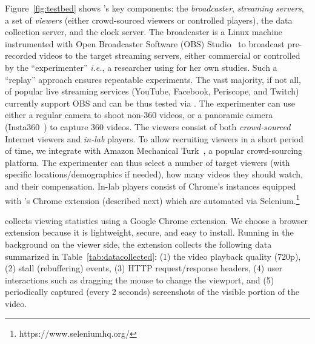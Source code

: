 Figure~\ref{fig:testbed} shows \lime's key components: the \emph{broadcaster}, \emph{streaming servers}, a set of \emph{viewers} (either crowd-sourced viewers or controlled players), the data collection server, and the clock server.
%
The broadcaster is a Linux machine instrumented with Open Broadcaster Software (OBS) Studio~\cite{obs} to broadcast pre-recorded videos to the target streaming servers, either commercial or controlled by the ``experimenter'' \emph{i.e.}, a researcher using \lime for her own studies. Such a ``replay'' approach ensures repeatable experiments.
%
The vast majority, if not all, of popular live streaming services (\eg YouTube, Facebook, Periscope, and Twitch) currently support OBS and can be thus tested via \lime.
%
The experimenter can use either a regular camera to shoot non-360\degree{} videos,
or a panoramic camera (\eg Insta360~\cite{insta360}) to capture 360\degree{} videos.
%
The viewers consist of both \emph{crowd-sourced} Internet viewers and \emph{in-lab} players.  To allow recruiting viewers in a short period of time, we integrate \lime with Amazon Mechanical Turk~\cite{mturk}, a popular crowd-sourcing platform.
%
The experimenter can thus select a number of target viewers (with specific locations/demographics if needed), how many videos they should watch, and their compensation. In-lab players consist of Chrome's instances equipped with \lime's Chrome extension (described next) which are automated via Selenium.\footnote{https://www.seleniumhq.org/}

\lime collects viewing statistics using a Google Chrome extension.
%
We choose a browser extension because it is lightweight, secure, and easy to install.
%
Running in the background on the viewer side, the extension collects the following data summarized in Table~\ref{tab:datacollected}: (1) the video playback quality (\eg 720p), (2) stall (\ie rebuffering) events, (3) HTTP request/response headers, (4) user interactions such as dragging the mouse to change the viewport, and (5) periodically captured (every 2 seconds) screenshots of the visible portion of the video.

